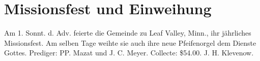\chapter{Missionsfest und Einweihung}

Am 1. Sonnt. d. Adv. feierte die Gemeinde zu Leaf Valley, Minn., ihr jährliches Missionsfest. Am selben Tage weihte sie auch ihre neue Pfeifenorgel dem Dienste Gottes. Prediger: PP. Mazat und J. C. Meyer. Collecte: \$54.00. J. H. Klevenow.
